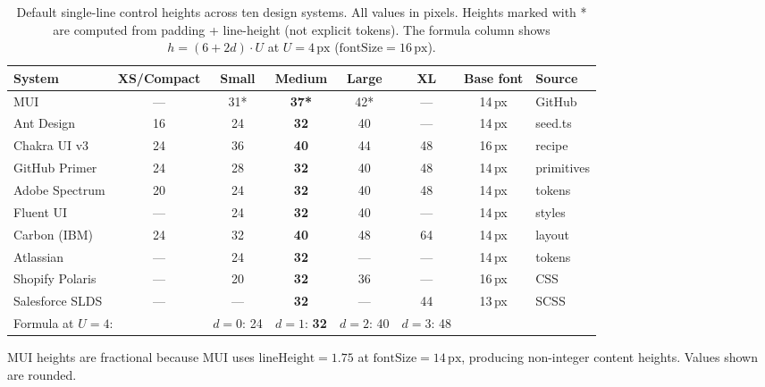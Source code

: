 \begin{table}[ht]
\centering
\caption{Default single-line control heights across ten design systems. All values in pixels. Heights marked with * are computed from padding + line-height (not explicit tokens). The formula column shows $h = (6 + 2d) \cdot U$ at $U = 4\,\text{px}$ ($\text{fontSize} = 16\,\text{px}$).}
\label{tab:benchmark-heights}
\small
\begin{tabular}{lccccccl}
\toprule
System & XS/Compact & Small & Medium & Large & XL & Base font & Source \\
\midrule
MUI              & ---  & 31*  & \textbf{37*} & 42*  & ---  & 14\,px & GitHub \\
Ant Design       & 16   & 24   & \textbf{32}  & 40   & ---  & 14\,px & seed.ts \\
Chakra UI v3     & 24   & 36   & \textbf{40}  & 44   & 48   & 16\,px & recipe \\
GitHub Primer    & 24   & 28   & \textbf{32}  & 40   & 48   & 14\,px & primitives \\
Adobe Spectrum   & 20   & 24   & \textbf{32}  & 40   & 48   & 14\,px & tokens \\
Fluent UI        & ---  & 24   & \textbf{32}  & 40   & ---  & 14\,px & styles \\
Carbon (IBM)     & 24   & 32   & \textbf{40}  & 48   & 64   & 14\,px & layout \\
Atlassian        & ---  & 24   & \textbf{32}  & ---  & ---  & 14\,px & tokens \\
Shopify Polaris  & ---  & 20   & \textbf{32}  & 36   & ---  & 16\,px & CSS \\
Salesforce SLDS  & ---  & ---  & \textbf{32}  & ---  & 44   & 13\,px & SCSS \\
\midrule
\multicolumn{2}{l}{Formula at $U = 4$:} & $d{=}0$: 24 & $d{=}1$: \textbf{32} & $d{=}2$: 40 & $d{=}3$: 48 & & \\
\bottomrule
\end{tabular}

\vspace{0.5em}
\footnotesize
MUI heights are fractional because MUI uses $\text{lineHeight} = 1.75$ at $\text{fontSize} = 14\,\text{px}$, producing non-integer content heights. Values shown are rounded.
\end{table}
